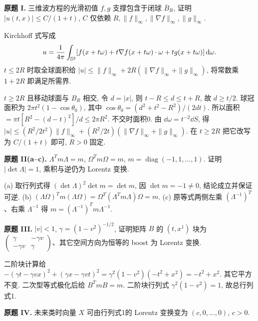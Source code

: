 \begin{exercise}\label{ps:7I}
\textbf{原题 I.} 三维波方程的光滑初值 $f,g$ 支撑包含于闭球 $\overline B_R$, 证明 $|u(t,x)|\le C/(1+t)$, $C$ 仅依赖 $R,\|f\|_\infty,\|\nabla f\|_\infty,\|g\|_\infty$.
\end{exercise}
\begin{solution}
Kirchhoff 式写成
\[
u=\frac1{4\pi}\int_{\mathbb S^2}[f(x+t\omega)+t\nabla f(x+t\omega)\cdot\omega+tg(x+t\omega)]\,\mathrm d\omega.
\]
$t\le2R$ 时取全球面积给 $|u|\le\|f\|_\infty+2R(\|\nabla f\|_\infty+\|g\|_\infty)$, 将常数乘 $1+2R$ 即满足所需界.

$t\ge2R$ 且移动球面与 $B_R$ 相交, 令 $d=|x|$, 则 $t-R\le d\le t+R$, 故 $d\ge t/2$. 球冠面积为 $2\pi t^2(1-\cos\theta_0)$, 其中 $\cos\theta_0=(d^2+t^2-R^2)/(2dt)$. 所以面积 $=\pi t[R^2-(d-t)^2]/d\le2\pi R^2$. 不交时面积0. 由 $\dd\omega=t^{-2}\dd S$, 得 $|u|\le (R^2/2t^2)\|f\|_\infty+(R^2/2t)(\|\nabla f\|_\infty+\|g\|_\infty)$. 在 $t\ge2R$ 把它改写为 $C/(1+t)$ 即可, $R>0$ 固定.
\end{solution}
\begin{exercise}\label{ps:7II}
\textbf{原题 II(a--c).} $\Lambda^Tm\Lambda=m$, $\Omega^Tm\Omega=m$, $m=\operatorname{diag}(-1,1,\ldots,1)$. 证明 $|\det\Lambda|=1$, 乘积与逆仍为 Lorentz 变换.
\end{exercise}
\begin{solution}
(a) 取行列式得 $(\det\Lambda)^2\det m=\det m$, 因 $\det m=-1\ne0$, 结论成立并保证可逆.
(b) $(\Lambda\Omega)^Tm(\Lambda\Omega)=\Omega^T(\Lambda^Tm\Lambda)\Omega=m$.
(c) 原等式两侧左乘 $(\Lambda^{-1})^T$、右乘 $\Lambda^{-1}$ 得 $m=(\Lambda^{-1})^Tm\Lambda^{-1}$.
\end{solution}
\begin{exercise}\label{ps:7III}
\textbf{原题 III.} $|v|<1$, $\gamma=(1-v^2)^{-1/2}$, 证明矩阵 $B$ 的 $(t,x^1)$ 块为 $\left(\begin{smallmatrix}\gamma&-\gamma v\\-\gamma v&\gamma\end{smallmatrix}\right)$、其它空间方向为恒等的 boost 为 Lorentz 变换.
\end{exercise}
\begin{solution}
二阶块计算给 $-(\gamma t-\gamma vx)^2+(\gamma x-\gamma vt)^2=\gamma^2(1-v^2)(-t^2+x^2)=-t^2+x^2$. 其它平方不变. 二次型等式极化后给 $B^TmB=m$. 二阶块行列式 $\gamma^2(1-v^2)=1$, 故总行列式1.
\end{solution}
\begin{exercise}\label{ps:7IV}
\textbf{原题 IV.} 未来类时向量 $X$ 可由行列式1的 Lorentz 变换变为 $(c,0,\ldots,0)$, $c>0$.
\end{exercise}

